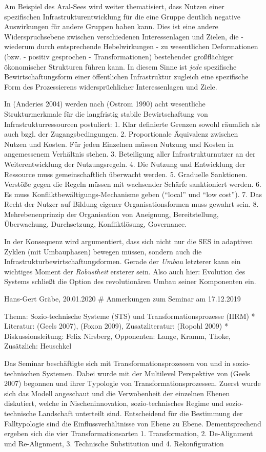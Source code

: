 \documentclass[11pt,a4paper]{article}
\begin{document}
Am Beispiel des Aral-Sees wird weiter thematisiert, dass Nutzen einer
spezifischen Infrastrukturentwicklung für die eine Gruppe deutlich
negative Auswirkungen für andere Gruppen haben kann. Dies ist eine
andere Widerspruchsebene zwischen verschiedenen Interessenlagen und
Zielen, die - wiederum durch entsprechende Hebelwirkungen - zu
wesentlichen Deformationen (bzw. - positiv gesprochen -
Transformationen) bestehender großflächiger ökonomischer Strukturen
führen kann. In diesem Sinne ist \emph{jede} spezifische
Bewirtschaftungsform einer öffentlichen Infrastruktur zugleich eine
spezifische Form des Prozessierens widersprüchlicher Interessenlagen und
Ziele.

In (Anderies 2004) werden nach (Ostrom 1990) acht wesentliche
Strukturmerkmale für die langfristig stabile Bewirtschaftung von
Infrastrukturressourcen postuliert: 1. Klar definierte Grenzen sowohl
räumlich als auch bzgl. der Zugangsbedingungen. 2. Proportionale
Äquivalenz zwischen Nutzen und Kosten. Für jeden Einzelnen müssen
Nutzung und Kosten in angemessenem Verhältnis stehen. 3. Beteiligung
aller Infrastrukturnutzer an der Weiterentwicklung der Nutzungsregeln.
4. Die Nutzung und Entwicklung der Ressource muss gemeinschaftlich
überwacht werden. 5. Graduelle Sanktionen. Verstöße gegen die Regeln
müssen mit wachsender Schärfe sanktioniert werden. 6. Es muss
Konfliktbewältigungs-Mechanisme geben (``local'' und ``low cost''). 7.
Das Recht der Nutzer auf Bildung eigener Organisationsformen muss
gewahrt sein. 8. Mehrebenenprinzip der Organisation von Aneignung,
Bereitstellung, Überwachung, Durchsetzung, Konfliktlösung, Governance.

In der Konsequenz wird argumentiert, dass sich nicht nur die SES in
adaptiven Zyklen (mit Umbauphasen) bewegen müssen, sondern auch die
Infrastrukturbewirtschaftungsformen. Gerade der \emph{Umbau} letzterer
kann ein wichtiges Moment der \emph{Robustheit} ersterer sein. Also auch
hier: Evolution des Systems schließt die Option des revolutionären Umbau
seiner Komponenten ein.

Hans-Gert Gräbe, 20.01.2020 \# Anmerkungen zum Seminar am 17.12.2019

Thema: Sozio-technische Systeme (STS) und Transformationsprozesse (IIRM)
* Literatur: (Geels 2007), (Foxon 2009), Zusatzliteratur: (Ropohl 2009)
* Diskussionsleitung: Felix Nirsberg, Opponenten: Lange, Kramm, Thoke,
Zusätzlich: Heuschkel

Das Seminar beschäftigte sich mit Transformationsprozessen von und in
sozio-technischen Systemen. Dabei wurde mit der Multilevel Perspektive
von (Geels 2007) begonnen und ihrer Typologie von
Transformationsprozessen. Zuerst wurde sich das Modell angeschaut und
die Verwobenheit der einzelnen Ebenen diskutiert, welche in
Nischeninnovation, sozio-technisches Regime und sozio-technische
Landschaft unterteilt sind. Entscheidend für die Bestimmung der
Falltypologie sind die Einflussverhältnisse von Ebene zu Ebene.
Dementsprechend ergeben sich die vier Transformationsarten 1.
Transformation, 2. De-Alignment und Re-Alignment, 3. Technische
Substitution und 4. Rekonfiguration
\end{document}
